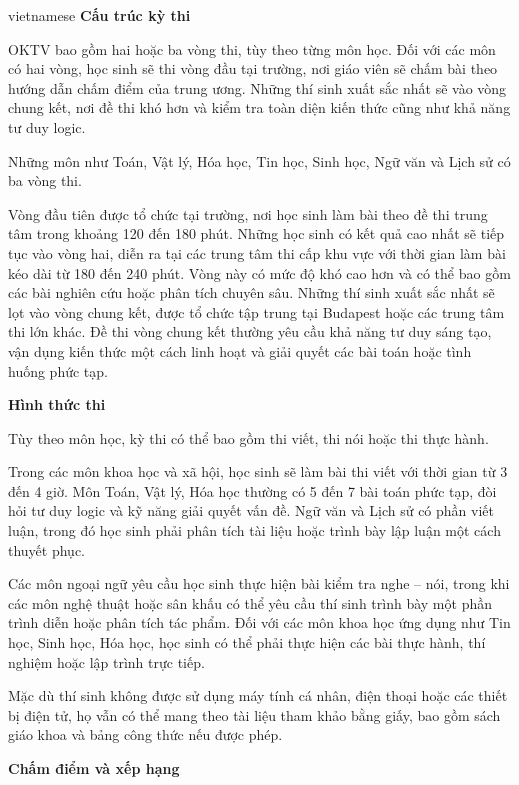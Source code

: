 \documentclass{article}
\begin{document}
\begin{otherlanguage*}{vietnamese}
\textbf{Cấu trúc kỳ thi}

OKTV bao gồm hai hoặc ba vòng thi, tùy theo từng môn học. Đối với các môn có hai vòng, học sinh sẽ thi vòng đầu tại trường, nơi giáo viên sẽ chấm bài theo hướng dẫn chấm điểm của trung ương.
Những thí sinh xuất sắc nhất sẽ vào vòng chung kết, nơi đề thi khó hơn và kiểm tra toàn diện kiến thức cũng như khả năng tư duy logic.

Những môn như Toán, Vật lý, Hóa học, Tin học, Sinh học, Ngữ văn và Lịch sử có ba vòng thi.
\begin{enumerate}[topsep=0pt, partopsep=0pt, itemsep=0pt]
    \ii Vòng đầu tiên được tổ chức tại trường, nơi học sinh làm bài theo đề thi trung tâm trong khoảng 120 đến 180 phút.
    \ii Những học sinh có kết quả cao nhất sẽ tiếp tục vào vòng hai, diễn ra tại các trung tâm thi cấp khu vực với thời gian làm bài kéo dài từ 180 đến 240 phút.
    Vòng này có mức độ khó cao hơn và có thể bao gồm các bài nghiên cứu hoặc phân tích chuyên sâu.
    \ii Những thí sinh xuất sắc nhất sẽ lọt vào vòng chung kết, được tổ chức tập trung tại Budapest hoặc các trung tâm thi lớn khác.
    Đề thi vòng chung kết thường yêu cầu khả năng tư duy sáng tạo, vận dụng kiến thức một cách linh hoạt và giải quyết các bài toán hoặc tình huống phức tạp.
\end{enumerate}

\textbf{Hình thức thi}

Tùy theo môn học, kỳ thi có thể bao gồm thi viết, thi nói hoặc thi thực hành.

Trong các môn khoa học và xã hội, học sinh sẽ làm bài thi viết với thời gian từ 3 đến 4 giờ.
Môn Toán, Vật lý, Hóa học thường có 5 đến 7 bài toán phức tạp, đòi hỏi tư duy logic và kỹ năng giải quyết vấn đề.
Ngữ văn và Lịch sử có phần viết luận, trong đó học sinh phải phân tích tài liệu hoặc trình bày lập luận một cách thuyết phục.

Các môn ngoại ngữ yêu cầu học sinh thực hiện bài kiểm tra nghe – nói, trong khi các môn nghệ thuật hoặc sân khấu có thể yêu cầu thí sinh trình bày một phần trình diễn hoặc phân tích tác phẩm.
Đối với các môn khoa học ứng dụng như Tin học, Sinh học, Hóa học, học sinh có thể phải thực hiện các bài thực hành, thí nghiệm hoặc lập trình trực tiếp.

Mặc dù thí sinh không được sử dụng máy tính cá nhân, điện thoại hoặc các thiết bị điện tử, họ vẫn có thể mang theo tài liệu tham khảo bằng giấy,
bao gồm sách giáo khoa và bảng công thức nếu được phép.

\textbf{Chấm điểm và xếp hạng}


\end{otherlanguage*}
\end{document}
